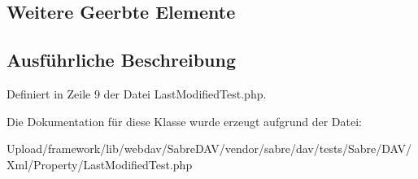 \subsection*{Weitere Geerbte Elemente}


\subsection{Ausführliche Beschreibung}


Definiert in Zeile 9 der Datei Last\+Modified\+Test.\+php.



Die Dokumentation für diese Klasse wurde erzeugt aufgrund der Datei\+:\begin{DoxyCompactItemize}
\item 
Upload/framework/lib/webdav/\+Sabre\+D\+A\+V/vendor/sabre/dav/tests/\+Sabre/\+D\+A\+V/\+Xml/\+Property/Last\+Modified\+Test.\+php\end{DoxyCompactItemize}

